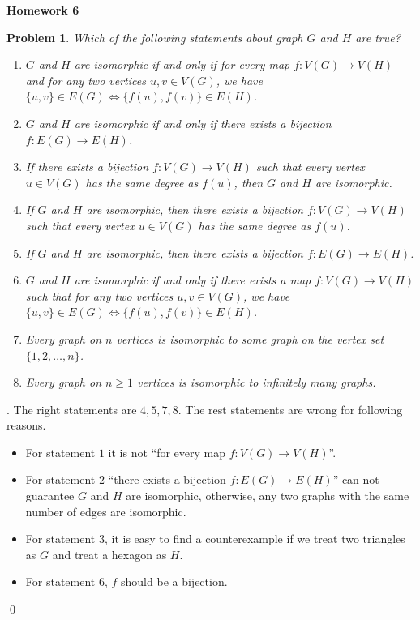 \documentclass[12pt]{article}
\date{Feb 14, 2012}
\newtheorem{hw}{Problem}
\newenvironment{sol}
  {\par\vspace{3mm}\noindent{\it Solution}.}
  {\qed}
\begin{document}
\begin{center}
{\LARGE\bf Homework 6}\\
\vspace{2mm}
\end{center}

\begin{hw}
  Which of the following statements about graph $G$ and $H$ are true?
  \begin{enumerate}
    \item $G$ and $H$ are isomorphic if and only if for every map $f:V(G)\rightarrow V(H)$ and for any two vertices $u,v\in V(G)$, we have $\{u,v\}\in E(G)\Leftrightarrow \{f(u),f(v)\}\in E(H)$.
    \item $G$ and $H$ are isomorphic if and only if there exists a bijection $f: E(G)\rightarrow E(H)$.
    \item If there exists a bijection $f:V(G)\rightarrow V(H)$ such that every vertex $u\in V(G)$ has the same degree as $f(u)$, then $G$ and $H$ are isomorphic.
    \item If $G$ and $H$ are isomorphic, then there exists a bijection $f:V(G)\rightarrow V(H)$ such that every vertex $u\in V(G) $ has the same degree as $f(u)$.
    \item If $G$ and $H$ are isomorphic, then there exists a bijection $f: E(G)\rightarrow E(H)$.
    \item $G$ and $H$ are isomorphic if and only if there exists a map $f:V(G)\rightarrow V(H)$ such that for any two vertices $u,v\in V(G)$, we have $\{u,v\}\in E(G)\Leftrightarrow \{f(u),f(v)\}\in E(H)$.
    \item Every graph on $n$ vertices is isomorphic to some graph on the vertex set $\{1,2,\ldots, n\}$.
    \item Every graph on $n\geq 1$ vertices is isomorphic to infinitely many graphs.
  \end{enumerate}
\end{hw}
\begin{sol}
	The right statements are $4, 5, 7, 8$. The rest statements are wrong for following reasons.
	\begin{itemize}
		\item For statement $1$ it is not ``for every map $f:V(G)\rightarrow V(H)$''.
		\item For statement $2$ ``there exists a bijection $f: E(G)\rightarrow E(H)$'' can not guarantee $G$ and $H$ are isomorphic, otherwise, any two graphs with the same number of edges are isomorphic.
		\item For statement $3$, it is easy to find a counterexample if we treat two triangles as $G$ and treat a hexagon as $H$.
		\item For statement $6$, $f$ should be a bijection.
	\end{itemize} 
\end{sol}
\end{document}
